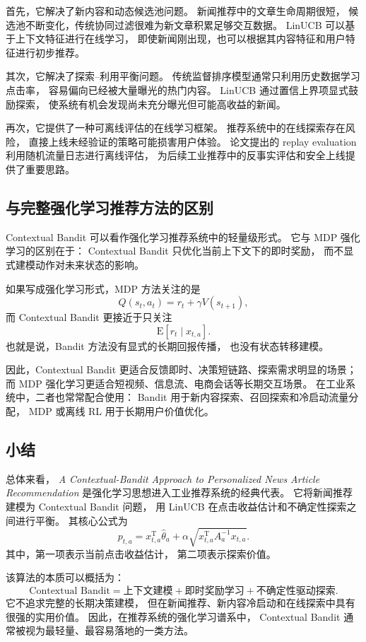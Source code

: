 \documentclass[11pt]{ctexart}
\begin{document}
首先，它解决了新内容和动态候选池问题。
新闻推荐中的文章生命周期很短，
候选池不断变化，传统协同过滤很难为新文章积累足够交互数据。
LinUCB 可以基于上下文特征进行在线学习，
即使新闻刚出现，也可以根据其内容特征和用户特征进行初步推荐。

其次，它解决了探索--利用平衡问题。
传统监督排序模型通常只利用历史数据学习点击率，
容易偏向已经被大量曝光的热门内容。
LinUCB 通过置信上界项显式鼓励探索，
使系统有机会发现尚未充分曝光但可能高收益的新闻。

再次，它提供了一种可离线评估的在线学习框架。
推荐系统中的在线探索存在风险，
直接上线未经验证的策略可能损害用户体验。
论文提出的 replay evaluation 利用随机流量日志进行离线评估，
为后续工业推荐中的反事实评估和安全上线提供了重要思路。

\subsection{与完整强化学习推荐方法的区别}

Contextual Bandit 可以看作强化学习推荐系统中的轻量级形式。
它与 MDP 强化学习的区别在于：
Contextual Bandit 只优化当前上下文下的即时奖励，
而不显式建模动作对未来状态的影响。

如果写成强化学习形式，MDP 方法关注的是
\[
Q(s_t,a_t)
=
r_t+\gamma V(s_{t+1}),
\]
而 Contextual Bandit 更接近于只关注
\[
\mathrm{E}[r_t\mid x_{t,a}].
\]
也就是说，Bandit 方法没有显式的长期回报传播，
也没有状态转移建模。

因此，Contextual Bandit 更适合反馈即时、决策短链路、探索需求明显的场景；
而 MDP 强化学习更适合短视频、信息流、电商会话等长期交互场景。
在工业系统中，二者也常常配合使用：
Bandit 用于新内容探索、召回探索和冷启动流量分配，
MDP 或离线 RL 用于长期用户价值优化。

\subsection{小结}

总体来看，
\textit{A Contextual-Bandit Approach to Personalized News Article Recommendation}
是强化学习思想进入工业推荐系统的经典代表。
它将新闻推荐建模为 Contextual Bandit 问题，
用 LinUCB 在点击收益估计和不确定性探索之间进行平衡。
其核心公式为
\[
p_{t,a}
=
x_{t,a}^{\mathrm{T}}\hat{\theta}_a
+
\alpha
\sqrt{
x_{t,a}^{\mathrm{T}}A_a^{-1}x_{t,a}
}.
\]
其中，第一项表示当前点击收益估计，
第二项表示探索价值。

该算法的本质可以概括为：
\[
\text{Contextual Bandit}
=
\text{上下文建模}
+
\text{即时奖励学习}
+
\text{不确定性驱动探索}.
\]
它不追求完整的长期决策建模，
但在新闻推荐、新内容冷启动和在线探索中具有很强的实用价值。
因此，在推荐系统的强化学习谱系中，
Contextual Bandit 通常被视为最轻量、最容易落地的一类方法。
\end{document}
